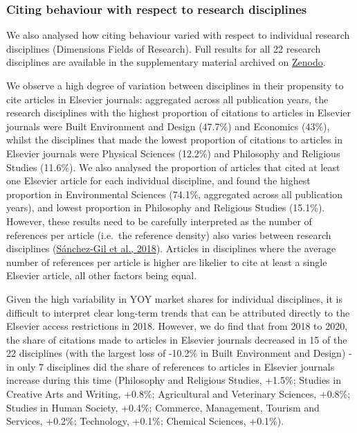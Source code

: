 \documentclass[
]{article}
\begin{document}
\hypertarget{citing-behaviour-with-respect-to-research-disciplines}{%
\subsubsection{Citing behaviour with respect to research disciplines}\label{citing-behaviour-with-respect-to-research-disciplines}}

We also analysed how citing behaviour varied with respect to individual research disciplines (Dimensions Fields of Research). Full results for all 22 research disciplines are available in the supplementary material archived on \href{https://doi.org/10.5281/zenodo.4771575}{Zenodo}.

We observe a high degree of variation between disciplines in their propensity to cite articles in Elsevier journals: aggregated across all publication years, the research disciplines with the highest proportion of citations to articles in Elsevier journals were Built Environment and Design (47.7\%) and Economics (43\%), whilst the disciplines that made the lowest proportion of citations to articles in Elsevier journals were Physical Sciences (12.2\%) and Philosophy and Religious Studies (11.6\%). We also analysed the proportion of articles that cited at least one Elsevier article for each individual discipline, and found the highest proportion in Environmental Sciences (74.1\%, aggregated across all publication years), and lowest proportion in Philosophy and Religious Studies (15.1\%). However, these results need to be carefully interpreted as the number of references per article (i.e.~the reference density) also varies between research disciplines (\href{https://doi.org/10.1016/j.joi.2017.11.003}{Sánchez-Gil et al., 2018}). Articles in disciplines where the average number of references per article is higher are likelier to cite at least a single Elsevier article, all other factors being equal.

Given the high variability in YOY market shares for individual disciplines, it is difficult to interpret clear long-term trends that can be attributed directly to the Elsevier access restrictions in 2018. However, we do find that from 2018 to 2020, the share of citations made to articles in Elsevier journals decreased in 15 of the 22 disciplines (with the largest loss of -10.2\% in Built Environment and Design) - in only 7 disciplines did the share of references to articles in Elsevier journals increase during this time (Philosophy and Religious Studies, +1.5\%; Studies in Creative Arts and Writing, +0.8\%; Agricultural and Veterinary Sciences, +0.8\%; Studies in Human Society, +0.4\%; Commerce, Management, Tourism and Services, +0.2\%; Technology, +0.1\%; Chemical Sciences, +0.1\%).
\end{document}
